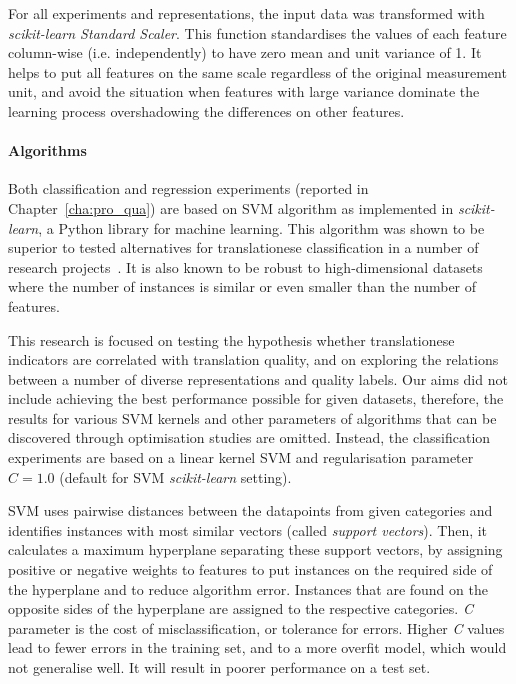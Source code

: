 For all experiments and representations, the input data was transformed with \textit{scikit-learn Standard Scaler}. This function standardises the values of each feature column-wise (i.e. independently) to have zero mean and unit variance of 1. It helps to put all features on the same scale regardless of the original measurement unit, and avoid the situation when features with large variance dominate the learning process overshadowing the differences on other features.

\paragraph{Algorithms} Both classification and regression experiments (reported in Chapter~\ref{cha:pro_qua}) are based on \gls{SVM} algorithm as implemented in \textit{scikit-learn}, a Python library for machine learning. 
This algorithm was shown to be superior to tested alternatives for translationese classification in a number of research projects~\cite[see, for example,][]{Ilisei2010}. It is also known to be robust to high-dimensional datasets where the number of instances is similar or even smaller than the number of features.

This research is focused on testing the hypothesis whether translationese indicators are correlated with translation quality, and on exploring the relations between a number of diverse representations and quality labels. Our aims did not include achieving the best performance possible for given datasets, therefore, the results for various SVM kernels and other parameters of algorithms that can be discovered through optimisation studies are omitted. 
Instead, the classification experiments are based on a linear kernel SVM and regularisation parameter $C=1.0$ (default for SVM \textit{scikit-learn} setting).

SVM uses pairwise distances between the datapoints from given categories and identifies instances with most similar vectors (called \textit{support vectors}). Then, it calculates a maximum hyperplane separating these support vectors, by assigning positive or negative weights to features to put instances on the required side of the hyperplane and to reduce algorithm error. Instances that are found on the opposite sides of the hyperplane are assigned to the respective categories. 
\textit{C} parameter is the cost of misclassification, or tolerance for errors. Higher \textit{C} values lead to fewer errors in the training set, and to a more overfit model, which would not generalise well. It will result in poorer performance on a test set.
%

